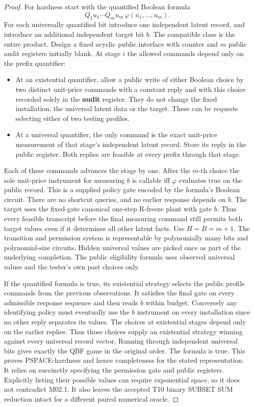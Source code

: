 \begin{proof}
For hardness start with the quantified Boolean formula
\[
 Q_1u_1\cdots Q_m u_m\,\varphi(u_1,\ldots,u_m).
\]
For each universally quantified bit introduce one independent latent record, and introduce an additional independent target bit \(b\). The compatible class is the entire product. Design a fixed acyclic public interface with counter and \(m\) public audit registers initially blank. At stage \(i\) the allowed commands depend only on the prefix quantifier:

\begin{itemize}

\item
  At an existential quantifier, allow a public write of either Boolean choice by two distinct unit-price commands with a constant reply and with this choice recorded solely in the \textbf{audit} register. They do not change the fixed installation, the universal latent data or the target. These can be requests selecting either of two testing profiles.
\item
  At a universal quantifier, the only command is the exact unit-price measurement of that stage's independent latent record. Store its reply in the public register. Both replies are feasible at every prefix through that stage.
\end{itemize}

Each of these commands advances the stage by one. After the \(m\)-th choice the sole unit-price instrument for measuring \(b\) is callable iff \(\varphi\) evaluates true on the public record. This is a supplied policy gate encoded by the formula's Boolean circuit. There are no shortcut queries, and no earlier response depends on \(b\). The target uses the fixed-gate canonical one-step R-freeze plant with gate \(b\). Thus every feasible transcript before the final measuring command still permits both target values even if it determines all other latent facts. Use \(H=B=m+1\). The transition and permission system is representable by polynomially many bits and polynomial-size circuits. Hidden universal values are picked once as part of the underlying completion. The public eligibility formula uses observed universal values and the tester's own past choices only.

If the quantified formula is true, its existential strategy selects the public profile commands from the previous observations. It satisfies the final gate on every admissible response sequence and then reads \(b\) within budget. Conversely any identifying policy must eventually use the \(b\) instrument on every installation since no other reply separates its values. The choices at existential stages depend only on the earlier replies. Thus those choices supply an existential strategy winning against every universal record vector. Running through independent universal bits gives exactly the QBF game in the original order. The formula is true. This proves PSPACE-hardness and hence completeness for the stated representation. It relies on succinctly specifying the permission gate and public registers. Explicitly listing their possible values can require exponential space, so it does not contradict M02.1. It also leaves the accepted T10 binary SUBSET SUM reduction intact for a different paired numerical oracle.


\end{proof}
